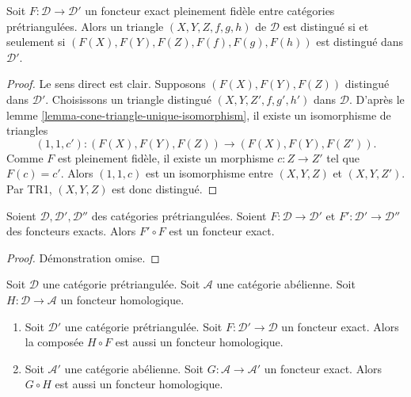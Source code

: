 \begin{lemma}
\label{lemma-exact-equivalence}
Soit $F : \mathcal{D} \to \mathcal{D}'$ un foncteur exact pleinement fidèle
entre catégories prétriangulées. Alors un triangle $(X, Y, Z, f, g, h)$ de
$\mathcal{D}$ est distingué si et seulement si
$(F(X), F(Y), F(Z), F(f), F(g), F(h))$ est distingué dans $\mathcal{D}'$.
\end{lemma}

\begin{proof}
Le sens direct est clair. Supposons $(F(X), F(Y), F(Z))$ distingué dans
$\mathcal{D}'$. Choisissons un triangle distingué
$(X, Y, Z', f, g', h')$ dans $\mathcal{D}$. D'après le
lemme \ref{lemma-cone-triangle-unique-isomorphism}, il existe un isomorphisme de
triangles
$$
(1, 1, c') : (F(X), F(Y), F(Z)) \longrightarrow (F(X), F(Y), F(Z')).
$$
Comme $F$ est pleinement fidèle, il existe un morphisme $c : Z \to Z'$ tel que
$F(c) = c'$. Alors $(1, 1, c)$ est un isomorphisme entre $(X, Y, Z)$ et
$(X, Y, Z')$. Par TR1, $(X, Y, Z)$ est donc distingué.
\end{proof}

\begin{lemma}
\label{lemma-composition-exact}
Soient $\mathcal{D}, \mathcal{D}', \mathcal{D}''$ des catégories
prétriangulées. Soient $F : \mathcal{D} \to \mathcal{D}'$ et
$F' : \mathcal{D}' \to \mathcal{D}''$ des foncteurs exacts.
Alors $F' \circ F$ est un foncteur exact.
\end{lemma}

\begin{proof}
Démonstration omise.
\end{proof}

\begin{lemma}
\label{lemma-exact-compose-homological-functor}
Soit $\mathcal{D}$ une catégorie prétriangulée.
Soit $\mathcal{A}$ une catégorie abélienne.
Soit $H : \mathcal{D} \to \mathcal{A}$ un foncteur homologique.
\begin{enumerate}
\item Soit $\mathcal{D}'$ une catégorie prétriangulée.
Soit $F : \mathcal{D}' \to \mathcal{D}$ un foncteur exact.
Alors la composée $H \circ F$ est aussi un foncteur homologique.
\item Soit $\mathcal{A}'$ une catégorie abélienne. Soit
$G : \mathcal{A} \to \mathcal{A}'$ un foncteur exact.
Alors $G \circ H$ est aussi un foncteur homologique.
\end{enumerate}
\end{lemma}

